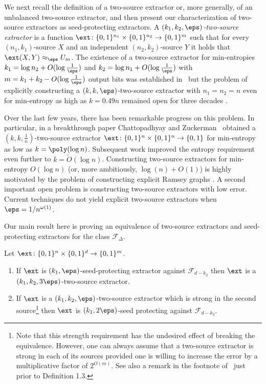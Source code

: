 We next recall the definition of a two-source extractor or, more generally, of
an %
unbalanced two-source %
%
extractor,  %
and then present our characterization of two-source extractors as seed-protecting extractors. A \emph{$(k_1,k_2,\eps)$-two-source extractor} is a function $\ext \colon \{0,1\}^{n_1} \times \{0,1\}^{n_2} \to \{0,1\}^m$ such that for every $(n_1,k_1)$-source $X$ and an independent $(n_2,k_2)$-source $Y$ it holds that $\ext(X,Y) \approx_\eps U_m$. The existence of a two-source extractor for min-entropies $k_1 = \log{n_2}+ O(\log\frac1{\eps})$ and $k_2 = \log{n_1} + O(\log\frac1{\eps})$ with $m=k_1+k_2-O(\log\frac1{\eps})$ output bits was established %
%
in~\cite{CG88}  %
but the problem of explicitly constructing a $(k,k,\eps)$-two-source extractor with $n_1 = n_2 = n$ even for min-entropy as high as $k = 0.49n$ remained open for three decades \cite{CG88,Bourgain05,Raz05}.

Over the last few years, there has been remarkable progress on this problem. In particular, in a breakthrough %
paper %
Chattopadhyay and Zuckerman~\cite{CZ19}  obtained a $(k,k,\frac1{n})$-two-source extractor $\ext \colon \{0,1\}^n \times \{0,1\}^n \to \{0,1\}$ for min-entropy as low as $k = \poly(\log{n})$. %
Subsequent  %
work
\cite{BADTS17,Cohen17,Li19} improved the entropy requirement even further to $k = \widetilde{O}(\log{n})$. Constructing two-source extractors for min-entropy $O(\log{n})$ (or, more ambitiously, $\log(n)+O(1)$) is highly motivated by the problem of constructing explicit Ramsey graphs \cite{BKSSW10,BRSW12,Cohen16,Cohen17}. A second important open problem is constructing two-source extractors with low error. Current techniques do not yield explicit two-source extractors when 
%
%
$\eps = 1/n^{\omega(1)}$. 
%



Our main result here is proving an equivalence of two-source extractors and seed-protecting extractors for the class $\mathcal{F}_{\Delta}$.  %
%
%


%
\begin{theorem}  %
\label{thm:two source sp intro}
	Let $\ext \colon \{0,1\}^n \times \{0,1\}^d \to \{0,1\}^m$. 
	\begin{enumerate}
		\item If $\ext$ is $(k_1,\eps)$-seed-protecting extractor against $\mathcal{F}_{d-k_2}$ then $\ext$ is a $(k_1,k_2,3\eps)$-two-source extractor.
		\item If $\ext$ is a $(k_1,k_2,\eps)$-two-source extractor which is strong in the second source\footnote{Note that this %
strength %
requirement has the undesired effect of breaking the equivalence. However, one can always assume that a two-source extractor is strong in each of its sources provided one is willing to increase the error by a multiplicative factor of $2^{O(m)}$. See also a remark in the footnote of~\cite{Raz05} just prior to Definition 1.3.} then $\ext $ is $(k_1,2\eps)$-seed protecting against $\mathcal{F}_{d-k_2}$.
	\end{enumerate}
\end{theorem}


